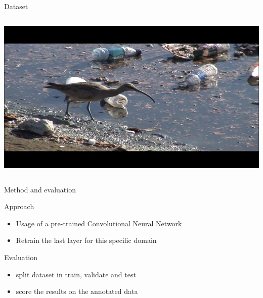 \documentclass{beamer}
\begin{document}
\begin{frame}{Dataset}
\begin{columns}[c]
\begin{column}{.4\textwidth}
                \includegraphics[width=\textwidth]{images/9077_11.jpg}\\
            \end{column}
        \end{columns}
    \end{frame}
    
    \begin{frame}{Method and evaluation}
        \begin{block}{Approach}
            \begin{itemize}
            \item Usage of a pre-trained Convolutional Neural Network
            \item Retrain the last layer for this specific domain
            \end{itemize}
        \end{block}
        \begin{block}{Evaluation}
            \begin{itemize}
            \item split dataset in train, validate and test
            \item score the results on the annotated data
            \end{itemize}
        \end{block}
    \end{frame}
\end{document}
